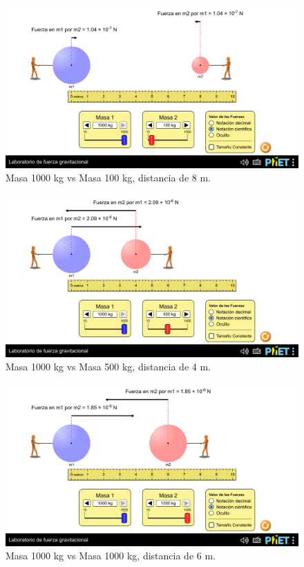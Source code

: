 \documentclass[a4paper,12pt]{article}
\begin{document}
\begin{figure}[h]
    \centering
    \includegraphics[width=1\linewidth]{m1_1000_m2_100_r_8.png}
    \caption{Masa 1000 kg vs Masa 100 kg, distancia de 8 m.}
\end{figure}

\begin{figure}[h]
    \centering
    \includegraphics[width=1\linewidth]{m1_1000_m2_500_r_4.png}
    \caption{Masa 1000 kg vs Masa 500 kg, distancia de 4 m.}
\end{figure}

\begin{figure}[h]
    \centering
    \includegraphics[width=1\linewidth]{m1_1000_m2_1000_r_6.png}
    \caption{Masa 1000 kg vs Masa 1000 kg, distancia de 6 m.}
\end{figure}
\end{document}
